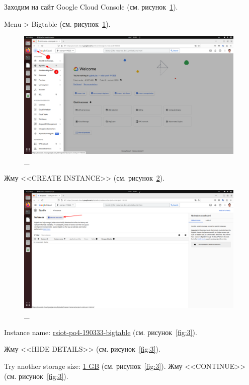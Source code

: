 \documentclass[12pt, a4paper, simple]{eskdtext}
\begin{document}
  Заходим на сайт Google Cloud Console \cite{GoogleCloudConsole} (см. рисунок~\ref{fig:1}).

  Menu > Bigtable \cite{GoogleCloudBigTable} (см. рисунок~\ref{fig:1}).

  \begin{figure}[!h]
    \centering
    \includegraphics[width=11cm]
    {images/GoogleCloudBigTable/2023-03-01_06-52-29.png}
    \caption{\_}
    \label{fig:1}
  \end{figure}

  Жму <<CREATE INSTANCE>> (см. рисунок~\ref{fig:2}).

  \begin{figure}[!h]
    \centering
    \includegraphics[width=11cm]
    {images/GoogleCloudBigTable/2023-03-01_06-53-01.png}
    \caption{\_}
    \label{fig:2}
  \end{figure}

  \newpage

  Instance name: \underline{rsiot-po4-190333-bigtable} (см. рисунок~\ref{fig:3}).
  

  Жму <<HIDE DETAILS>> (см. рисунок~\ref{fig:3}).

  Try another storage size: \underline{1 GB} (см. рисунок~\ref{fig:3}). Жму <<CONTINUE>> (см. рисунок~\ref{fig:3}).
\end{document}
